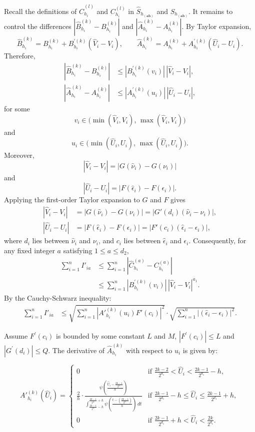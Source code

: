 \documentclass[12pt,reqno,oneside]{amsbook}
\theoremstyle{definition}
\theoremstyle{remark}
\begin{document}
Recall the definitions of $\hat{C}_{{h}_i}^{(l)}$ and $C_{{h}_i}^{(l)}$ in
$\hat{S}_{h_{(\mathbf{ab})}}$ and $S_{h_{(\mathbf{ab})}}$. It remains to control the differences
$|\hat{B}_{{h}_i}^{(k)}-B_{{h}_i}^{(k)}|$
and
$|\hat{A}_{{h}_i}^{(k)}-A_{{h}_i}^{(k)}|$.
By Taylor expansion,
\[
\hat{B}_{{h}_i}^{(k)}
=
B_{{h}_i}^{(k)}
+
B_{{h}_i}^{\prime(k)}(\hat{V}_i-V_i),
\qquad
\hat{A}_{{h}_i}^{(k)}
=
A_{{h}_i}^{(k)}
+
A_{{h}_i}^{\prime(k)}(\hat{U}_i-U_i).
\]
Therefore,
\begin{align*}
|\hat{B}_{{h}_i}^{(k)}-B_{{h}_i}^{(k)}|
&\leq
|B_{{h}_i}^{\prime(k)}(v_i)|\,|\hat{V}_i-V_i|,\\
|\hat{A}_{{h}_i}^{(k)}-A_{{h}_i}^{(k)}|
&\leq
|A_{{h}_i}^{\prime(k)}(u_i)|\,|\hat{U}_i-U_i|,
\end{align*}
for some
\[
v_i\in
\bigl(\min(\hat{V}_i,V_i),\,\max(\hat{V}_i,V_i)\bigr)
\]
and
\[
u_i\in
\bigl(\min(\hat{U}_i,U_i),\,\max(\hat{U}_i,U_i)\bigr).
\]
Moreover,
\[
|\hat{V}_i-V_i|
=
|G(\hat{\nu}_i)-G(\nu_i)|
\]
and
\[
|\hat{U}_i-U_i|
=
|F(\hat{\epsilon}_i)-F(\epsilon_i)|.
\]
Applying the first-order Taylor expansion to $G$ and $F$ gives
\begin{align*}
|\hat{V}_i-V_i|
&=
|G(\hat{\nu}_i)-G(\nu_i)|
=
|G'(d_i)(\hat{\nu}_i-\nu_i)|,\\
|\hat{U}_i-U_i|
&=
|F(\hat{\epsilon}_i)-F(\epsilon_i)|
=
|F'(c_i)(\hat{\epsilon}_i-\epsilon_i)|,
\end{align*}
where $d_i$ lies between $\hat{\nu}_i$ and $\nu_i$, and $c_i$ lies between $\hat{\epsilon}_i$ and $\epsilon_i$. Consequently, for any fixed integer $a$ satisfying $1\leq a\leq d_2$,
\begin{align*}
    \sum_{i=1}^{n} I'_{ia}
    &\leq \sum_{i=1}^{n}|\hat{C}_{h_i}^{(a)}-C_{h_i}^{(a)}| \\
    &\leq \sum_{i=1}^{n}
    |B_{{h}_i}^{\prime(k)}(v_i)|\,|\hat{V}_i-V_i|^{a_1}.
\end{align*}
By the Cauchy-Schwarz inequality:
\begin{align*}
\sum_{i=1}^{n} I'_{ia} 
&\leq \sqrt{\sum_{i=1}^{n} |A'^{(k)}_{{h}_i}(u_i)F'(c_i)|^2}\cdot \sqrt{\sum_{i=1}^{n} |(\hat{\epsilon}_i - \epsilon_i)|^2}.
\end{align*}

Assume $F^{'}(c_i)$ is bounded by some constant $L$ and $M$, $|F^{'}(c_i)|\leq L$ and $|G^{'}(d_i)|\leq Q$.
The derivative of  $\hat{A}_{{h}_i}^{(k)}$  with respect to $u_i$ is given by:

$$
A'^{(k)}_{{h}_i}(\hat{U}_i) = \begin{cases} 
      0 & \text{if } \frac{2k-2}{2^{d_1}} < \hat{U}_i < \frac{2k-1}{2^{d_1}}-h, \\[10pt]
      \frac{2}{h} \cdot \frac{\psi\left(\frac{\hat{U}_i - \frac{2k-1}{2^{d_1}}}{h}\right)}{\int_{\frac{2k-1}{2^{d_1}}-h}^{\frac{2k-1}{2^{d_1}} + h}  \psi\left(\frac{t-(\frac{2k-1}{2^{d_1}})}{h}\right) \, dt} & \text{if } \frac{2k-1}{2^{d_1}}-h \leq \hat{U}_i \leq \frac{2k-1}{2^{d_1}} +h, \\[10pt]
      0 & \text{if } \frac{2k-1}{2^{d_1}} + h < \hat{U}_i < \frac{2k}{2^{d_1}}.
\end{cases}
$$
\end{document}
